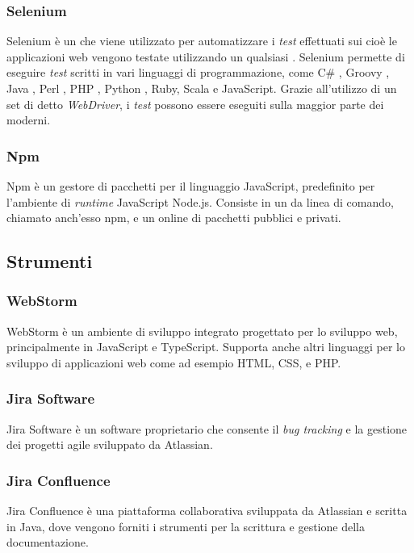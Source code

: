 \subsubsection*{Selenium}
Selenium è un   che viene utilizzato per automatizzare i \emph{test} effettuati sui  cioè le applicazioni web vengono testate utilizzando un qualsiasi . Selenium permette di eseguire \emph{test} scritti in vari linguaggi di programmazione, come C\# , Groovy , Java , Perl , \gls{PHP} , Python , Ruby, Scala e JavaScript. Grazie all'utilizzo di un set di  detto \emph{WebDriver}, i \emph{test} possono essere eseguiti sulla maggior parte dei  moderni.

\subsubsection*{Npm}
Npm è un gestore di pacchetti per il linguaggio JavaScript, predefinito per l'ambiente di \emph{runtime} JavaScript Node.js. Consiste in un 
 da linea di comando, chiamato anch'esso npm, e un  online di pacchetti pubblici e privati.

\subsection{Strumenti}

\subsubsection*{WebStorm}
WebStorm è un ambiente di sviluppo integrato progettato per lo sviluppo web, principalmente in JavaScript e TypeScript. Supporta anche altri linguaggi per lo sviluppo di applicazioni web come ad esempio \gls{HTML}, \gls{CSS}, e \gls{PHP}.

\subsubsection{Jira Software}
Jira Software è un software proprietario che consente il \emph{bug tracking} e la gestione dei progetti agile sviluppato da Atlassian.

\subsubsection{Jira Confluence}
Jira Confluence è una piattaforma collaborativa sviluppata da Atlassian e scritta in Java, dove vengono forniti i strumenti per la scrittura e gestione della documentazione.

